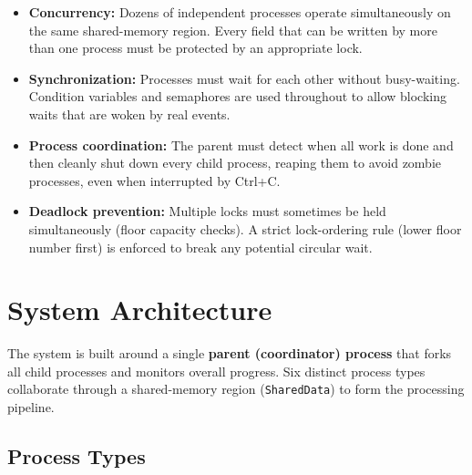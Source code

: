 \documentclass[12pt,a4paper]{article}
\newcommand{\code}[1]{\texttt{\small #1}}
\begin{document}
\begin{itemize}
  \item \textbf{Concurrency:} Dozens of independent processes operate simultaneously
        on the same shared-memory region. Every field that can be written by more
        than one process must be protected by an appropriate lock.
  \item \textbf{Synchronization:} Processes must wait for each other without
        busy-waiting. Condition variables and semaphores are used throughout to
        allow blocking waits that are woken by real events.
  \item \textbf{Process coordination:} The parent must detect when all work is done
        and then cleanly shut down every child process, reaping them to avoid zombie
        processes, even when interrupted by Ctrl+C.
  \item \textbf{Deadlock prevention:} Multiple locks must sometimes be held
        simultaneously (floor capacity checks). A strict lock-ordering rule (lower
        floor number first) is enforced to break any potential circular wait.
\end{itemize}

\section{System Architecture}

The system is built around a single \textbf{parent (coordinator) process} that
forks all child processes and monitors overall progress. Six distinct process types
collaborate through a shared-memory region (\code{SharedData}) to form the
processing pipeline.

\subsection{Process Types}
\end{document}
